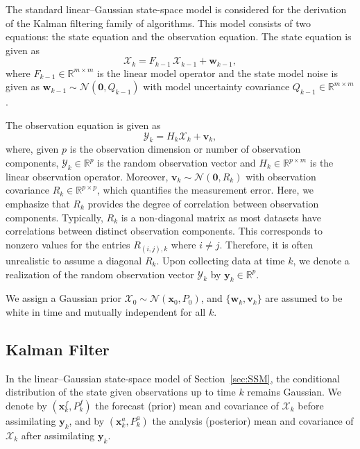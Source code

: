 \documentclass[11p]{elsarticle}
\numberwithin{equation}{section}
\newcommand{\vect}[1]{\ensuremath{\bm{#1}}}
\begin{document}
The standard linear–Gaussian state-space model is considered for the derivation of the Kalman filtering family of algorithms. This model consists of two equations: the state equation and the observation equation.  The state equation is given as
\begin{equation}
  \vect{\mathcal{X}}_k = F_{k-1}\, \vect{\mathcal{X}}_{k-1} + \vect{w}_{k-1}, 
  \label{eq:SSM1}
\end{equation}
where $F_{k-1}\in\mathbb{R}^{m\times m}$ is the linear model operator and the state model noise is given as $\vect{w}_{k-1}\sim\mathcal{N}(\vect{0}, Q_{k-1})$ with model uncertainty covariance $Q_{k-1}\in\mathbb{R}^{m\times m}$.



The observation equation is given as
\begin{equation}
  \vect{\mathcal{Y}}_k = H_k \vect{\mathcal{X}}_k + \vect{v}_k,
  \label{eq:SSM2}
\end{equation}
where, {given $p$ is the observation dimension or number of observation components}, $\vect{\mathcal{Y}}_k\in\mathbb{R}^p$ is the random observation vector and $H_k\in\mathbb{R}^{p\times m}$ is the linear observation operator. 
Moreover,  $\vect{v}_k\sim\mathcal{N}(\vect{0},R_k)$ with observation covariance $R_k\in\mathbb{R}^{p\times p}$, 
which quantifies the measurement error. Here, we emphasize that $R_k$ provides the degree of correlation between
observation components. Typically, $R_k$ is a non-diagonal matrix as most datasets have correlations between distinct
observation components. This corresponds to nonzero values for the entries $R_{(i,j),k}$ where $i\neq j$. Therefore,
it is often unrealistic to assume a diagonal $R_k$.
Upon collecting data at time $k$, we denote a realization of the random observation vector $\vect{\mathcal{Y}}_k$ by $\vect{y}_k \in \mathbb{R}^p$.


We assign a Gaussian prior $\vect{\mathcal{X}}_0\sim\mathcal{N}(\vect{x}_0,P_0)$, and $\{\vect{w}_k,\vect{v}_k\}$ are assumed to be white in time and mutually independent for all $k$.


\subsection{Kalman Filter}
\label{sec:KF}

In the linear--Gaussian state-space model of Section~\ref{sec:SSM}, the
conditional distribution of the state given observations up to time $k$ remains
Gaussian. We denote by $(\vect{x}_k^f, P_k^f)$ the forecast (prior) mean and
covariance of $\vect{\mathcal{X}}_k$ before assimilating $\vect{y}_k$, and by
$(\vect{x}_k^a, P_k^a)$ the analysis (posterior) mean and covariance of $\vect{\mathcal{X}}_k$ after
assimilating $\vect{y}_k$.
\end{document}
